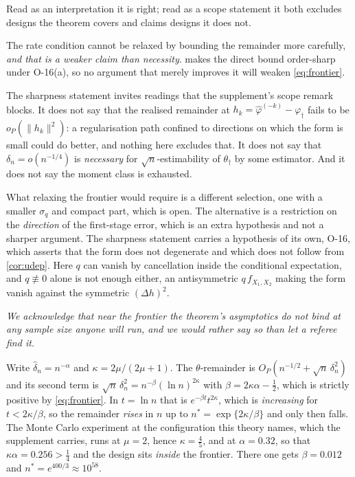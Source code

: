 \documentclass[
  12pt]{article}
\newcommand{\1}[1]{\mathds{1}\left[#1\right]}
\theoremstyle{plain}
\theoremstyle{definition}
\theoremstyle{definition}
\theoremstyle{remark}
\newcommand{\vdagger}{\varphi_{\dagger}}
\begin{document}
Read as an interpretation it is right; read as a scope statement it both
excludes designs the theorem covers and claims designs it does not.

The rate condition cannot be relaxed by bounding the remainder more
carefully, \emph{and that is a weaker claim than necessity}.
 makes the direct bound order-sharp under O-16(a),
so no argument that merely improves it will weaken \eqref{eq:frontier}.

The sharpness statement invites readings that the supplement's scope
remark blocks. It does not say that the realised remainder at
\(h_k=\hat\varphi^{(-k)}-\vdagger\) fails to be \(o_P(\|h_k\|^{2})\): a
regularisation path confined to directions on which the form is small
could do better, and nothing here excludes that. It does not say that
\(\delta_n=o(n^{-1/4})\) is \emph{necessary} for
\(\sqrt n\)-estimability of \(\theta_\dagger\) by some estimator. And it
does not say the moment class is exhausted.

What relaxing the frontier would require is a different selection, one
with a smaller \(\sigma_q\) and compact part, which is open. The
alternative is a restriction on the \emph{direction} of the first-stage
error, which is an extra hypothesis and not a sharper argument. The
sharpness statement carries a hypothesis of its own, O-16, which asserts
that the form does not degenerate and which does not follow from
\cref{cor:udep}. Here \(q\) can vanish by cancellation inside the
conditional expectation, and \(q\not\equiv0\) alone is not enough
either, an antisymmetric \(q\,f_{X_1,X_2}\) making the form vanish
against the symmetric \((\Delta h)^{2}\).

\emph{We acknowledge that near the frontier the theorem's asymptotics do
not bind at any sample size anyone will run, and we would rather say so
than let a referee find it.}

Write \(\hat\delta_n=n^{-\alpha}\) and \(\kappa=2\mu/(2\mu+1)\). The
\(\theta\)-remainder is \(O_P(n^{-1/2}+\sqrt n\,\delta_n^{2})\) and its
second term is \(\sqrt n\,\delta_n^{2}=n^{-\beta}(\ln n)^{2\kappa}\)
with \(\beta=2\kappa\alpha-\tfrac12\), which is strictly positive by
\eqref{eq:frontier}. In \(t=\ln n\) that is \(e^{-\beta t}t^{2\kappa}\),
which is \emph{increasing} for \(t<2\kappa/\beta\), so the remainder
\emph{rises} in \(n\) up to \(n^{\ast}=\exp\{2\kappa/\beta\}\) and only
then falls. The Monte Carlo experiment at the configuration this theory
names, which the supplement carries, runs at \(\mu=2\), hence
\(\kappa=\tfrac45\), and at \(\alpha=0.32\), so that
\(\kappa\alpha=0.256>\tfrac14\) and the design sits \emph{inside} the
frontier. There one gets \(\beta=0.012\) and
\(n^{\ast}=e^{400/3}\approx10^{58}\).
\end{document}
